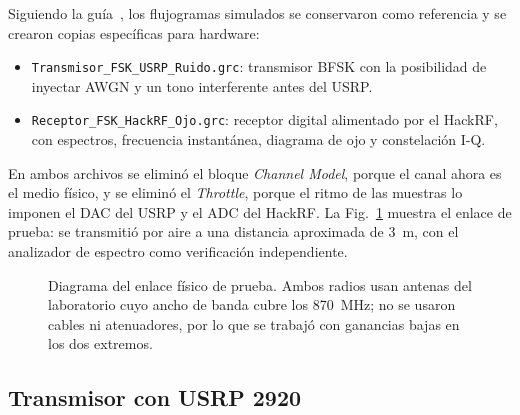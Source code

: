 \documentclass[conference]{IEEEtran}
\begin{document}
Siguiendo la guía~\cite{guia3}, los flujogramas simulados se conservaron como referencia y se crearon copias específicas para hardware:
\begin{itemize}
\item \texttt{Transmisor\_FSK\_USRP\_Ruido.grc}: transmisor BFSK con la posibilidad de inyectar AWGN y un tono interferente antes del USRP.
\item \texttt{Receptor\_FSK\_HackRF\_Ojo.grc}: receptor digital alimentado por el HackRF, con espectros, frecuencia instantánea, diagrama de ojo y constelación I-Q.
\end{itemize}

En ambos archivos se eliminó el bloque \textit{Channel Model}, porque el canal ahora es el medio físico, y se eliminó el \textit{Throttle}, porque el ritmo de las muestras lo imponen el DAC del USRP y el ADC del HackRF. La Fig.~\ref{fig:enlace} muestra el enlace de prueba: se transmitió por aire a una distancia aproximada de 3~m, con el analizador de espectro como verificación independiente.

\begin{figure}[!t]
\centering
{}
\caption{Diagrama del enlace físico de prueba. Ambos radios usan antenas del laboratorio cuyo ancho de banda cubre los 870~MHz; no se usaron cables ni atenuadores, por lo que se trabajó con ganancias bajas en los dos extremos.}
\label{fig:enlace}
\end{figure}

\subsection{Transmisor con USRP 2920}
\end{document}
